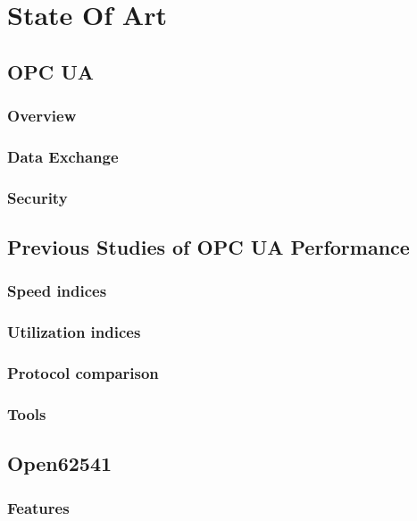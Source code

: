 \chapter{State Of Art}\label{chapter:stateofart}
\section{OPC UA}

\subsection{Overview}
\subsection{Data Exchange}
\subsection{Security}


\section{Previous Studies of OPC UA Performance}
\subsection{Speed indices}
\subsection{Utilization indices}
\subsection{Protocol comparison}
\subsection{Tools}

\section{Open62541}
\subsection{Features}
